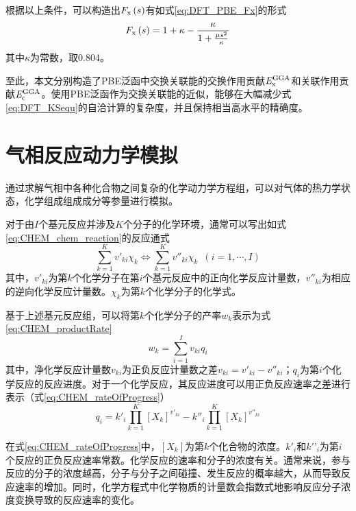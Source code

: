 根据以上条件，可以构造出$F_{\rm x}\left(s\right)$有如式\eqref{eq:DFT_PBE_Fx}的形式\chinesecolon
\begin{equation}
    \label{eq:DFT_PBE_Fx}
    F_{\rm x}\left(s\right)=1+\kappa -\frac{\kappa }{1+\frac{\mu s^2}{\kappa}}
\end{equation}
其中$\kappa$为常数，取0.804。

至此，本文分别构造了PBE泛函中交换关联能的交换作用贡献$\it E_{\rm x}^{\rm GGA} \it$和关联作用贡献$\it E_{\rm c}^{\rm GGA} \it$。使用PBE泛函作为交换关联能的近似，能够在大幅减少式\eqref{eq:DFT_KSequ}的自洽计算的复杂度，并且保持相当高水平的精确度。
\section{气相反应动力学模拟}
通过求解气相中各种化合物之间复杂的化学动力学方程组，可以对气体的热力学状态，化学组成组成成分等参量进行模拟。

对于由$I$个基元反应并涉及$K$个分子的化学环境，通常可以写出如式\eqref{eq:CHEM_chem_reaction}的反应通式
\begin{equation}
    \label{eq:CHEM_chem_reaction}
    \sum_{k=1}^Kv'_{ki}\chi_k\Leftrightarrow \sum_{k=1}^K v''_{ki}\chi_k\enspace\left(i=1,\cdots,I\right)
\end{equation}
其中，$v'_{ki}$为第$k$个化学分子在第$i$个基元反应中的正向化学反应计量数，$v''_{ki}$为相应的逆向化学反应计量数。$\chi_k$为第$k$个化学分子的化学式。

基于上述基元反应组，可以将第$k$个化学分子的产率$w_k$表示为式\eqref{eq:CHEM_productRate}\chinesecolon
\begin{equation}
    \label{eq:CHEM_productRate}
    w_k=\sum_{i=1}^Iv_{ki}q_i
\end{equation}
其中，净化学反应计量数$v_{ki}$为正负反应计量数之差$v_{ki}=v'_{ki}-v''_{ki}$；$q_i$为第$i$个化学反应的反应进度。对于一个化学反应，其反应进度可以用正负反应速率之差进行表示（式\eqref{eq:CHEM_rateOfProgress}）\chinesecolon
\begin{equation}
    \label{eq:CHEM_rateOfProgress}
    q_i=k'_i\prod_{k=1}^{K}\left[X_k\right]^{v'_{ki}}-k''_i\prod_{k=1}^{K}\left[X_k\right]^{v''_{ki}}
\end{equation}

在式\eqref{eq:CHEM_rateOfProgress}中，$\left[X_k\right]$为第$k$个化合物的浓度。$k'_i$和$k'’_i$为第$i$个反应的正负反应速率常数。化学反应的速率和分子的浓度有关。通常来说，参与反应的分子的浓度越高，分子与分子之间碰撞、发生反应的概率越大，从而导致反应速率的增加。同时，化学方程式中化学物质的计量数会指数式地影响反应分子浓度变换导致的反应速率的变化。

